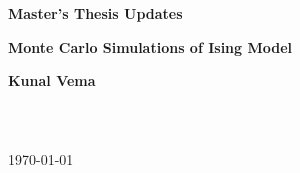 \documentclass[a4paper,12pt]{report}
\numberwithin{equation}{section}
\begin{document}
\begin{titlepage}
    \vspace*{3cm}
    \begin{center}
    \Huge {\textbf{\textsf{Master's Thesis Updates}}} 
    \end{center}
    \vspace{1cm}
    \begin{center}
    \huge {\textbf{{Monte Carlo Simulations of Ising Model}}}
    \end{center}
    \vspace{2cm} 
    \begin{center} 
    \Large {\textbf{Kunal Vema}} \\[3pt]  
     \\ [2cm] 
     \\ [3pt]
     \\ [1cm] 
    {\today}
    \end{center}
   
    \end{titlepage}
    \setcounter{page}{2}
    \clearpage


\tableofcontents
\newpage


\newpage
\newpage
\newpage



\newpage
\printbibliography
\end{document}
